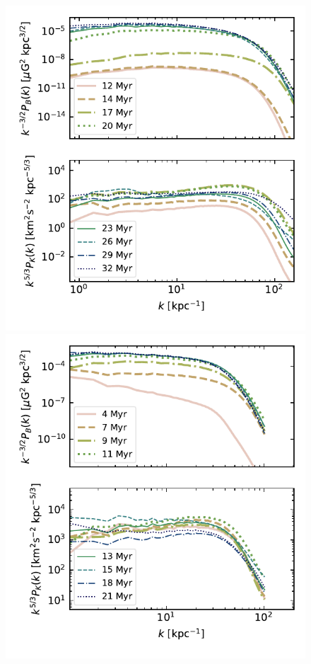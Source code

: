 \documentclass[preprint2]{aastex63}
\begin{document}
\begin{figure}
  \includegraphics[trim=0.5cm 0.2cm 0.3cm 0.0cm, clip=true,width=\columnwidth]{figs/0_5pcPm0e-4_0kpower.pdf}
  \includegraphics[trim=0.5cm 0.5cm 0.3cm 0.0cm, clip=true,width=\columnwidth]{figs/bals256rkpower.pdf}

\end{figure}
\end{document}
